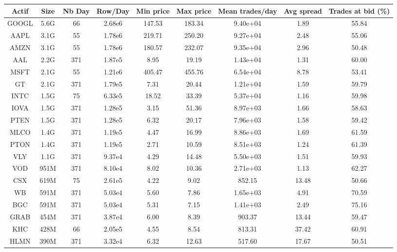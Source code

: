 \documentclass[10pt,a4paper]{article}
\theoremstyle{definition}
\theoremstyle{remark}
\begin{document}
\begin{table}[h!]
\hspace{-2.5cm}
\begin{tabular}{|c|c|c|c|c|c|c|c|c|}
\hline
\textbf{Actif} & \textbf{Size} & \textbf{Nb Day} & \textbf{Row/Day} & \textbf{Min price} & \textbf{Max price} & \textbf{Mean trades/day} & \textbf{Avg spread} & \textbf{Trades at bid (\%)}\\ \hline
GOOGL & 5.6G & 66 & 2.68e6 & 147.53 & 183.34 & 9.40e+04 & 1.89 & 55.84 \\ \hline
AAPL & 3.1G & 55 & 1.78e6 & 219.71 & 250.20 & 9.27e+04 & 2.48 & 55.06 \\ \hline
AMZN & 3.1G & 55 & 1.78e6 & 180.57 & 232.07 & 9.35e+04 & 2.96 & 50.48 \\ \hline
AAL & 2.2G & 371 & 1.87e5 & 8.95 & 19.19 & 1.43e+04 & 1.31 & 60.00 \\ \hline
MSFT & 2.1G & 55 & 1.21e6 & 405.47 & 455.76 & 6.54e+04 & 8.78 & 53.41 \\ \hline
GT & 2.1G & 371 & 1.79e5 & 7.31 & 20.44 & 1.21e+04 & 1.59 & 59.79 \\ \hline
INTC & 1.5G & 75 & 6.33e5 & 18.52 & 33.39 & 5.37e+04 & 1.16 & 59.98 \\ \hline
IOVA & 1.5G & 371 & 1.28e5 & 3.15 & 51.36 & 8.97e+03 & 1.66 & 58.63 \\ \hline
PTEN & 1.5G & 371 & 1.28e5 & 6.32 & 20.17 & 7.96e+03 & 1.58 & 59.42 \\ \hline
MLCO & 1.4G & 371 & 1.19e5 & 4.47 & 16.99 & 8.86e+03 & 1.69 & 61.59 \\ \hline
PTON & 1.4G & 371 & 1.19e5 & 2.71 & 10.59 & 8.51e+03 & 1.24 & 61.39 \\ \hline
VLY & 1.1G & 371 & 9.37e4 & 4.29 & 14.48 & 5.50e+03 & 1.51 & 59.93 \\ \hline
VOD & 951M & 371 & 8.10e4 & 8.02 & 10.36 & 2.71e+03 & 1.13 & 62.27 \\ \hline
CSX & 619M & 75 & 2.61e5 & 4.22 & 9.02 & 852.15 & 13.48 & 50.66 \\ \hline
WB & 591M & 371 & 5.03e4 & 5.60 & 7.86 & 1.65e+03 & 4.91 & 70.59 \\ \hline
BGC & 591M & 371 & 5.03e4 & 5.31 & 7.15 & 1.41e+03 & 2.49 & 75.16 \\ \hline
GRAB & 454M & 371 & 3.87e4 & 6.00 & 8.39 & 903.37 & 13.44 & 59.47 \\ \hline
KHC & 428M & 66 & 2.05e5 & 4.55 & 8.54 & 813.31 & 37.42 & 60.91 \\ \hline
HLMN & 390M & 371 & 3.32e4 & 6.32 & 12.63 & 517.60 & 17.67 & 50.51 \\ \hline

\end{tabular}
\end{table}
\end{document}
